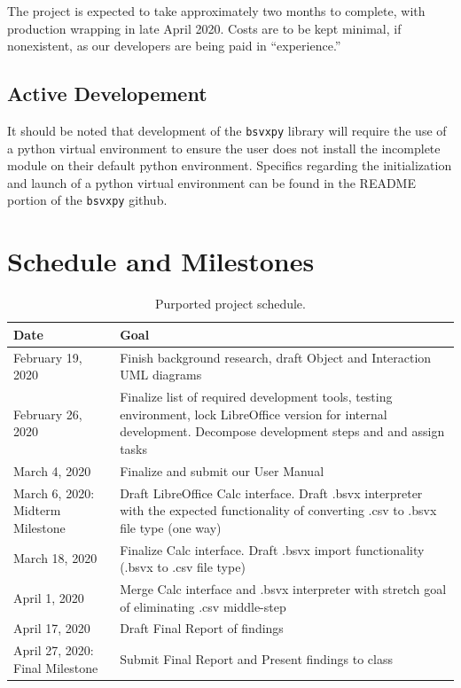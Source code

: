 \documentclass[10pt]{article}
\begin{document}
\indent{}
The project is expected to take approximately two months to complete, with production wrapping in late April 2020.
Costs are to be kept minimal, if nonexistent, as our developers are being paid in “experience.”

\subsection*{Active Developement}
\indent{}
It should be noted that development of the \texttt{bsvxpy} library will require the use of a python virtual environment to ensure the user does not install the incomplete module on their default python environment.
Specifics regarding the initialization and launch of a python virtual environment can be found in the README portion of the \texttt{bsvxpy} github.

\section*{Schedule and Milestones}

\begin{table}[H]
\centering
\begin{tabular}{|p{80pt}|p{375pt}|}
\hline
\textbf{Date} & \textbf{Goal} \\ \hline
February 19, 2020 & Finish background research, draft Object and Interaction UML diagrams \\ \hline
February 26, 2020 & Finalize list of required development tools, testing environment, lock LibreOffice version for internal development. Decompose development steps and and assign tasks \\ \hline
March 4, 2020 & Finalize and submit our User Manual \\ \hline
March 6, 2020: Midterm Milestone & Draft LibreOffice Calc interface.
Draft .bsvx interpreter with the expected functionality of converting .csv to .bsvx file type (one way) \\ \hline
March 18, 2020 & Finalize Calc interface. Draft .bsvx import functionality (.bsvx to .csv file type) \\ \hline
April 1, 2020 & Merge Calc interface and .bsvx interpreter with stretch goal of eliminating .csv middle-step \\ \hline
April 17, 2020 & Draft Final Report of findings \\ \hline
April 27, 2020: Final Milestone & Submit Final Report and Present findings to class \\ \hline
\end{tabular}
\caption{Purported project schedule.}
\label{tab:approach_schedule}
\end{table}
\end{document}
